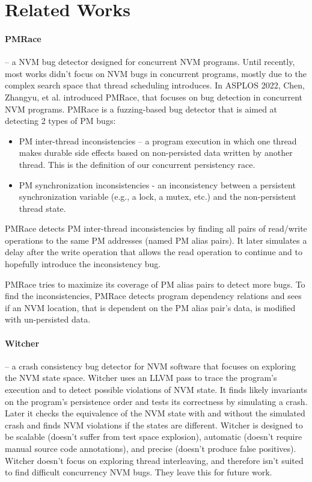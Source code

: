 \documentclass[a4paper,12pt]{article}
\begin{document}
\section{Related Works}
\paragraph{PMRace} \cite{Chen22} – a NVM bug detector designed for concurrent NVM programs.
Until recently, most works didn’t focus on NVM bugs in concurrent programs, mostly due to the complex search space that thread scheduling introduces.
In ASPLOS 2022, Chen, Zhangyu, et al. introduced PMRace, that focuses on bug detection in concurrent NVM programs. 
PMRace is a fuzzing-based bug detector that is aimed at detecting 2 types of PM bugs:
\begin{itemize}
    \item PM inter-thread inconsistencies – a program execution in which one thread makes durable side effects based on non-persisted data written by another thread. This is the definition of our concurrent persistency race.
    \item PM synchronization inconsistencies - an inconsistency between a persistent synchronization variable (e.g., a lock, a mutex, etc.) and the non-persistent thread state.
\end{itemize}
PMRace detects PM inter-thread inconsistencies by finding all pairs of read/write operations to the same PM addresses (named PM alias pairs). It later simulates a delay after the write operation that allows the read operation to continue and to hopefully introduce the inconsistency bug.

PMRace tries to maximize its coverage of PM alias pairs to detect more bugs. To find the inconsistencies, PMRace detects program dependency relations and sees if an NVM location, that is dependent on the PM alias pair’s data, is modified with un-persisted data.

\paragraph{Witcher} \cite{Fu21} – a crash consistency bug detector for NVM software that focuses on exploring the NVM state space.
Witcher uses an LLVM pass to trace the program's execution and to detect possible violations of NVM state. It finds likely invariants on the program’s persistence order and tests its correctness by simulating a crash. Later it checks the equivalence of the NVM state with and without the simulated crash and finds NVM violations if the states are different.
Witcher is designed to be scalable (doesn’t suffer from test space explosion), automatic (doesn’t require manual source code annotations), and precise (doesn’t produce false positives).
Witcher doesn’t focus on exploring thread interleaving, and therefore isn’t suited to find difficult concurrency NVM bugs. They leave this for future work.
\end{document}

